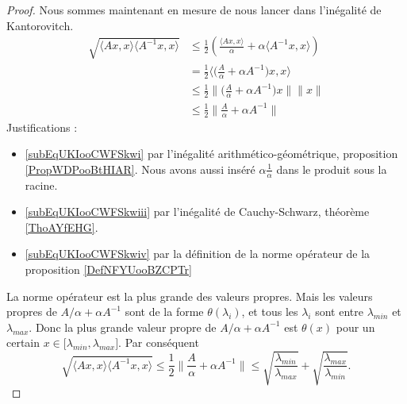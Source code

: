 \begin{proof}
    Nous sommes maintenant en mesure de nous lancer dans l'inégalité de Kantorovitch.
    \begin{subequations}
        \begin{align}
            \sqrt{\langle Ax, x\rangle \langle A^{-1}x, x\rangle }&\leq\frac{ 1 }{2}\left( \frac{ \langle Ax, x\rangle  }{ \alpha }+\alpha\langle A^{-1}x, x\rangle  \right)\label{subEqUKIooCWFSkwi}\\
            &=\frac{ 1 }{2}\langle   \big( \frac{ A }{ \alpha }+\alpha A^{-1} \big)x , x\rangle \\
            &\leq\frac{ 1 }{2}\Big\| \big( \frac{ A }{ \alpha }+\alpha A^{-1} \big)x \|\| x \| \label{subEqUKIooCWFSkwiii}\\
            &\leq \frac{ 1 }{2}\| \frac{ A }{ \alpha }+\alpha A^{-1} \| \label{subEqUKIooCWFSkwiv}
        \end{align}
    \end{subequations}
    Justifications :
    \begin{itemize}
        \item \ref{subEqUKIooCWFSkwi} par l'inégalité arithmético-géométrique, proposition \ref{PropWDPooBtHIAR}. Nous avons aussi inséré \( \alpha\frac{1}{ \alpha }\) dans le produit sous la racine.
        \item \ref{subEqUKIooCWFSkwiii} par l'inégalité de Cauchy-Schwarz, théorème \ref{ThoAYfEHG}.
        \item \ref{subEqUKIooCWFSkwiv} par la définition de la norme opérateur de la proposition \ref{DefNFYUooBZCPTr}
    \end{itemize}
    La norme opérateur est la plus grande des valeurs propres. Mais les valeurs propres de \( A/\alpha+\alpha A^{-1}\) sont de la forme \( \theta(\lambda_i)\), et tous les \( \lambda_i\) sont entre \( \lambda_{min} \) et \( \lambda_{max}\). Donc la plus grande valeur propre de \( A/\alpha+\alpha A^{-1}\) est \( \theta(x)\) pour un certain \( x\in\mathopen[ \lambda_{min} , \lambda_{max} \mathclose]\). Par conséquent
    \begin{equation}
            \sqrt{\langle Ax, x\rangle \langle A^{-1}x, x\rangle }\leq \frac{ 1 }{2}\| \frac{ A }{ \alpha }+\alpha A^{-1} \| \leq \sqrt{\frac{ \lambda_{min} }{ \lambda_{max} }}+\sqrt{\frac{ \lambda_{max} }{ \lambda_{min} }}.
    \end{equation}
\end{proof}
